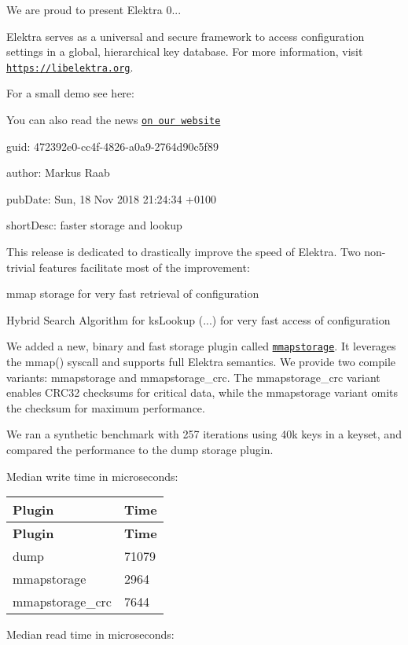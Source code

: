 We are proud to present Elektra 0...

Elektra serves as a universal and secure framework to access configuration settings in a global, hierarchical key database. For more information, visit \href{https://libelektra.org}{\tt https\+://libelektra.\+org}.

For a small demo see here\+:

\href{https://asciinema.org/a/cantr04assr4jkv8v34uz9b8r}{\tt }

You can also read the news \href{https://www.libelektra.org/news/0.8.25-release}{\tt on our website}


\begin{DoxyItemize}
\item guid\+: 472392e0-\/cc4f-\/4826-\/a0a9-\/2764d90c5f89
\item author\+: Markus Raab
\item pub\+Date\+: Sun, 18 Nov 2018 21\+:24\+:34 +0100
\item short\+Desc\+: faster storage and lookup
\end{DoxyItemize}

This release is dedicated to drastically improve the speed of Elektra. Two non-\/trivial features facilitate most of the improvement\+:


\begin{DoxyItemize}
\item mmap storage for very fast retrieval of configuration
\item Hybrid Search Algorithm for {\ttfamily ks\+Lookup (...)} for very fast access of configuration
\end{DoxyItemize}

We added a new, binary and fast storage plugin called \href{https://libelektra.org/plugins/mmapstorage}{\tt {\ttfamily mmapstorage}}. It leverages the {\ttfamily mmap()} syscall and supports full Elektra semantics. We provide two compile variants\+: {\ttfamily mmapstorage} and {\ttfamily mmapstorage\+\_\+crc}. The {\ttfamily mmapstorage\+\_\+crc} variant enables C\+R\+C32 checksums for critical data, while the {\ttfamily mmapstorage} variant omits the checksum for maximum performance.

We ran a synthetic benchmark with 257 iterations using 40k keys in a keyset, and compared the performance to the {\ttfamily dump} storage plugin.

Median write time in microseconds\+:

\tabulinesep=1mm
\begin{longtabu} spread 0pt [c]{*{2}{|X[-1]}|}
\hline
\rowcolor{\tableheadbgcolor}\textbf{ Plugin }&\textbf{ Time  }\\
\endfirsthead
\hline
\endfoot
\hline
\rowcolor{\tableheadbgcolor}\textbf{ Plugin }&\textbf{ Time  }\\
\endhead
{\ttfamily dump} &71079 \\
{\ttfamily mmapstorage} &2964 \\
{\ttfamily mmapstorage\+\_\+crc} &7644 \\
\end{longtabu}
Median read time in microseconds\+:

